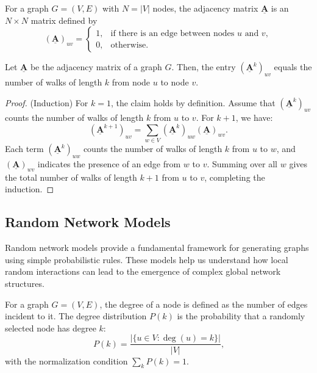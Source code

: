 \documentclass[10pt, headings=standardclasses, parskip=half, twoside]{scrartcl}
\renewcommand{\emph}[1]{\textcolor{mypurple}{#1}}
\newcommand{\matr}[1]{\underline{\boldsymbol{#1}}}
\begin{document}
\begin{definition}\label{def:adjacency}
For a graph \(G=(V,E)\) with \(N=|V|\) nodes, the adjacency matrix \(\matr{A}\) is an \(N\times N\) matrix defined by
\[
(\matr{A})_{uv}=
\begin{cases}
1, & \text{if there is an edge between nodes } u \text{ and } v,\\[1mm]
0, & \text{otherwise}.
\end{cases} 
\]
\end{definition}

\begin{theorem}\label{thm:walks}
Let \(\matr{A}\) be the adjacency matrix of a graph \(G\). Then, the entry \((\matr{A}^k)_{uv}\) equals the number of walks of length \(k\) from node \(u\) to node \(v\).
\end{theorem}
\begin{proof}
(Induction)
For \(k=1\), the claim holds by definition. 
Assume that \((\matr{A}^k)_{uv}\) counts the number of walks of length \(k\) from \(u\) to \(v\).
For \(k+1\), we have:
\[
(\matr{A}^{k+1})_{uv}=\sum_{w\in V} (\matr{A}^k)_{uw}(\matr{A})_{wv} \text{.}
\]
Each term \((\matr{A}^k)_{uw}\) counts the number of walks of length \(k\) from \(u\) to \(w\), and \((\matr{A})_{wv}\) indicates the presence of an edge from \(w\) to \(v\).
Summing over all \(w\) gives the total number of walks of length \(k+1\) from \(u\) to \(v\), completing the induction.
\end{proof}

\subsection{Random Network Models}\label{subsec:models}
Random network models provide a fundamental framework for generating graphs using simple probabilistic rules. 
These models help us understand how local random interactions can lead to the emergence of complex global network structures.

\begin{definition}\label{def:degree-distribution}
For a graph \(G=(V,E)\), the degree of a node is defined as the number of edges incident to it. 
The \emph{degree distribution} \(P(k)\) is the probability that a randomly selected node has degree \(k\):
\[
P(k)=\frac{|\{u\in V: \deg(u)=k\}|}{|V|} \text{,}
\]
with the normalization condition \(\sum_{k}P(k)=1\).
\end{definition}
\end{document}
